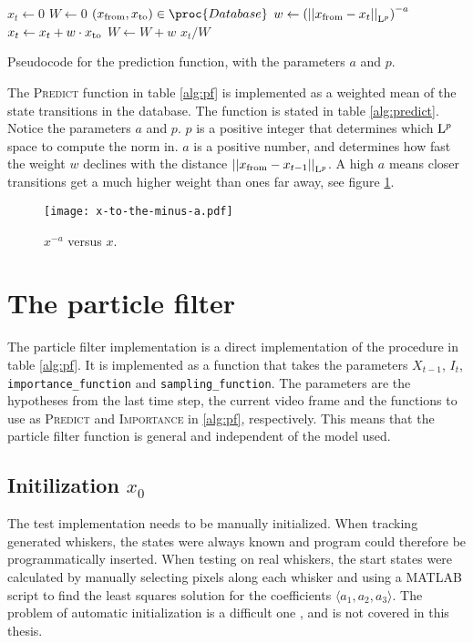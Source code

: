 \begin{table}[h]
  \begin{codebox}
    \li $ x_t \gets 0$
    \li $ W \gets 0$
    \li \ForEach $(\tf, \tt) \in \proc{Database}$
    \li \Do
      \li $ w \gets \left(\Lpnorm[p]{\tf - x_t}\right)^{-a}$
      \li $ x_t \gets x_t + w \cdot \tt$
      \li $ W \gets W + w$
    \End
    \li \Return $x_t / W$
  \end{codebox}
  \caption{Pseudocode for the prediction function, with the parameters $a$ and $p$.}
  \label{alg:predict}
\end{table}

The \textsc{Predict} function in table \ref{alg:pf} is implemented as a weighted mean of the
state transitions in the database. The function is stated in table
\ref{alg:predict}. Notice the parameters $a$ and $p$. $p$ is a
positive integer that determines which $\Lp$ space to compute the norm
in. $a$ is a positive number, and determines how fast the weight $w$
declines with the distance $\Lpnorm[p]{\tf - x_{t-1}}$. A high $a$
means closer transitions get a much higher weight than ones far away,
see figure \ref{fig:x-to-the-minus-a}.

\begin{figure}
  \centering
  \texttt{[image: x-to-the-minus-a.pdf]}
  \caption{$x^{-a}$ versus $x$.}
  \label{fig:x-to-the-minus-a}
\end{figure}




\section{The particle filter}
The particle filter implementation is a direct implementation of the
procedure in table \ref{alg:pf}. It is implemented as a function that
takes the parameters $X_{t-1}$, $I_t$, \texttt{importance\_function} and
\texttt{sampling\_function}. The parameters are the hypotheses from
the last time step, the current video frame and the functions to use
as \textsc{Predict} and \textsc{Importance} in \ref{alg:pf},
respectively. This means that the particle filter function is general
and independent of the model used.

\subsection{Initilization $x_0$}
The test implementation needs to be manually initialized. When
tracking generated whiskers, the states were always known and program
could therefore be programmatically inserted. When testing on real
whiskers, the start states were calculated by manually
selecting pixels along each whisker and using a MATLAB script to find
the least squares solution for the coefficients $\langle a_1, a_2, a_3
\rangle$. The problem of automatic initialization is a difficult one
\cite{Hedvig}, and is not covered in this thesis.

